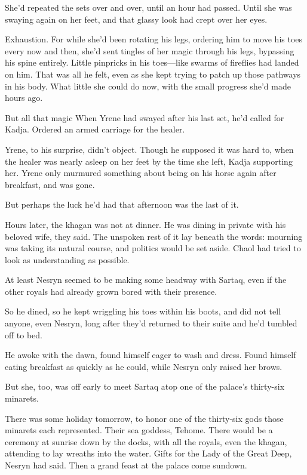 She'd repeated the sets over and over, until an hour had passed. Until she was swaying again on her feet, and that glassy look had crept over her eyes.

Exhaustion. For while she'd been rotating his legs, ordering him to move his toes every now and then, she'd sent tingles of her magic through his legs, bypassing his spine entirely. Little pinpricks in his toes---like swarms of fireflies had landed on him. That was all he felt, even as she kept trying to patch up those pathways in his body. What little she could do now, with the small progress she'd made hours ago.

But all that magic  When Yrene had swayed after his last set, he'd called for Kadja. Ordered an armed carriage for the healer.

Yrene, to his surprise, didn't object. Though he supposed it was hard to, when the healer was nearly asleep on her feet by the time she left, Kadja supporting her. Yrene only murmured something about being on his horse again after breakfast, and was gone.

But perhaps the luck he'd had that afternoon was the last of it.

Hours later, the khagan was not at dinner. He was dining in private with his beloved wife, they said. The unspoken rest of it lay beneath the words: mourning was taking its natural course, and politics would be set aside. Chaol had tried to look as understanding as possible.

At least Nesryn seemed to be making some headway with Sartaq, even if the other royals had already grown bored with their presence.

So he dined, so he kept wriggling his toes within his boots, and did not tell anyone, even Nesryn, long after they'd returned to their suite and he'd tumbled off to bed.

He awoke with the dawn, found himself  eager to wash and dress. Found himself eating breakfast as quickly as he could, while Nesryn only raised her brows.

But she, too, was off early to meet Sartaq atop one of the palace's thirty-six minarets.

There was some holiday tomorrow, to honor one of the thirty-six gods those minarets each represented. Their sea goddess, Tehome. There would be a ceremony at sunrise down by the docks, with all the royals, even the khagan, attending to lay wreaths into the water. Gifts for the Lady of the Great Deep, Nesryn had said. Then a grand feast at the palace come sundown.

